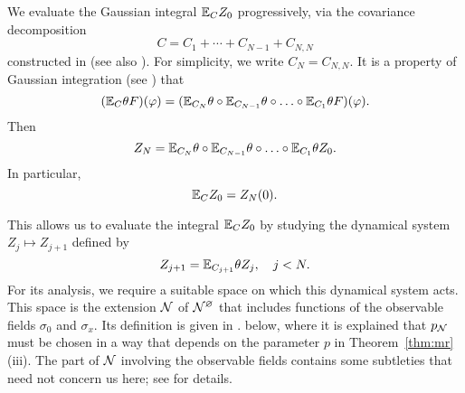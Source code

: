 We evaluate the Gaussian integral $\mathbb{E}_C Z_0$ progressively, via
the covariance decomposition
\begin{equation}
\label{e:NCj}
C = C_1 + \cdots + C_{N-1} + C_{N,N}
\end{equation}
constructed in \cite{Baue13a} (see also \cite{BGM04}). For simplicity, we write $C_N = C_{N,N}$.
It is a property of Gaussian integration (see \cite{BS-rg-norm}) that
\begin{equation}
	(\mathbb{E}_C \theta F)(\varphi)
	=
	(\mathbb{E}_{C_N}\theta \circ \mathbb{E}_{C_{N-1}}\theta \circ \ldots \circ \mathbb{E}_{C_1}\theta F)
	(\varphi).
\end{equation}
Then
\begin{equation}
Z_N
=
\mathbb{E}_{C_N}\theta \circ \mathbb{E}_{C_{N-1}}\theta \circ \ldots \circ \mathbb{E}_{C_1}\theta Z_0.
\end{equation}
In particular,
\begin{equation}
\mathbb{E}_C Z_0 = Z_N(0).
\end{equation}

This allows us to evaluate the integral $\mathbb{E}_C Z_0$ by studying the
dynamical system $Z_j \mapsto Z_{j+1}$ defined by
\begin{equation}
Z_{j+1} = \mathbb{E}_{C_{j+1}} \theta Z_j, \quad j < N.
\end{equation}
For its analysis, we require a suitable space on which this dynamical system acts.
This space is the extension $\mathcal{N}$ of $\mathcal{N}^\varnothing$ that includes functions
of the observable fields $\sigma_0$ and $\sigma_x$. Its definition is given
in \cite[Section~\ref{phi4-sec:phi4observables_representation}]{ST-phi4}.
below,
where it is explained that $p_{\mathcal{N}}$ must be chosen in a way that depends on the
parameter $p$ in Theorem~\ref{thm:mr}(iii).
The part of $\mathcal{N}$ involving the observable fields contains some subtleties that
need not concern us here; see \cite[Section~\ref{phi4-sec:phi4observables_representation}]{ST-phi4}
for details.

